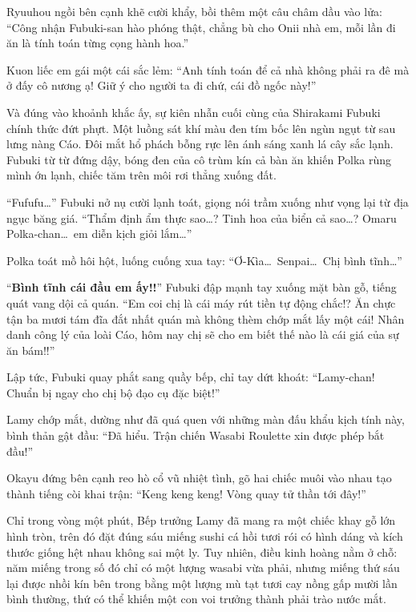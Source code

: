 \documentclass[../main.tex]{subfiles}
\begin{document}
Ryuuhou ngồi bên cạnh khẽ cười khẩy, bồi thêm một câu châm dầu vào lửa: ``Công nhận Fubuki-san hào phóng thật, chẳng bù cho Onii nhà em, mỗi lần đi ăn là tính toán từng cọng hành hoa.''

Kuon liếc em gái một cái sắc lẻm: ``Anh tính toán để cả nhà không phải ra đê mà ở đấy cô nương ạ! Giữ ý cho người ta đi chứ, cái đồ ngốc này!''

Và đúng vào khoảnh khắc ấy, sự kiên nhẫn cuối cùng của Shirakami Fubuki chính thức đứt phựt. Một luồng sát khí màu đen tím bốc lên ngùn ngụt từ sau lưng nàng Cáo. Đôi mắt hổ phách bỗng rực lên ánh sáng xanh lá cây sắc lạnh. Fubuki từ từ đứng dậy, bóng đen của cô trùm kín cả bàn ăn khiến Polka rùng mình ớn lạnh, chiếc tăm trên môi rơi thẳng xuống đất.

``Fufufu\dots'' Fubuki nở nụ cười lạnh toát, giọng nói trầm xuống như vọng lại từ địa ngục băng giá. ``Thẩm định ẩm thực sao\dots? Tinh hoa của biển cả sao\dots? Omaru Polka-chan\dots\ em diễn kịch giỏi lắm\dots''

Polka toát mồ hôi hột, luống cuống xua tay: ``Ơ-Kìa\dots\ Senpai\dots\ Chị bình tĩnh\dots''

``\textbf{Bình tĩnh cái đầu em ấy!!}'' Fubuki đập mạnh tay xuống mặt bàn gỗ, tiếng quát vang dội cả quán. ``Em coi chị là cái máy rút tiền tự động chắc!? Ăn chực tận ba mươi tám đĩa đắt nhất quán mà không thèm chớp mắt lấy một cái! Nhân danh công lý của loài Cáo, hôm nay chị sẽ cho em biết thế nào là cái giá của sự ăn bám!!''

Lập tức, Fubuki quay phắt sang quầy bếp, chỉ tay dứt khoát: ``Lamy-chan! Chuẩn bị ngay cho chị bộ đạo cụ đặc biệt!''

Lamy chớp mắt, dường như đã quá quen với những màn đấu khẩu kịch tính này, bình thản gật đầu: ``Đã hiểu. Trận chiến Wasabi Roulette xin được phép bắt đầu!''

Okayu đứng bên cạnh reo hò cổ vũ nhiệt tình, gõ hai chiếc muôi vào nhau tạo thành tiếng còi khai trận: ``Keng keng keng! Vòng quay tử thần tới đây!''

Chỉ trong vòng một phút, Bếp trưởng Lamy đã mang ra một chiếc khay gỗ lớn hình tròn, trên đó đặt đúng sáu miếng sushi cá hồi tươi rói có hình dáng và kích thước giống hệt nhau không sai một ly. Tuy nhiên, điều kinh hoàng nằm ở chỗ: năm miếng trong số đó chỉ có một lượng wasabi vừa phải, nhưng miếng thứ sáu lại được nhồi kín bên trong bằng một lượng mù tạt tươi cay nồng gấp mười lần bình thường, thứ có thể khiến một con voi trưởng thành phải trào nước mắt.
\end{document}
